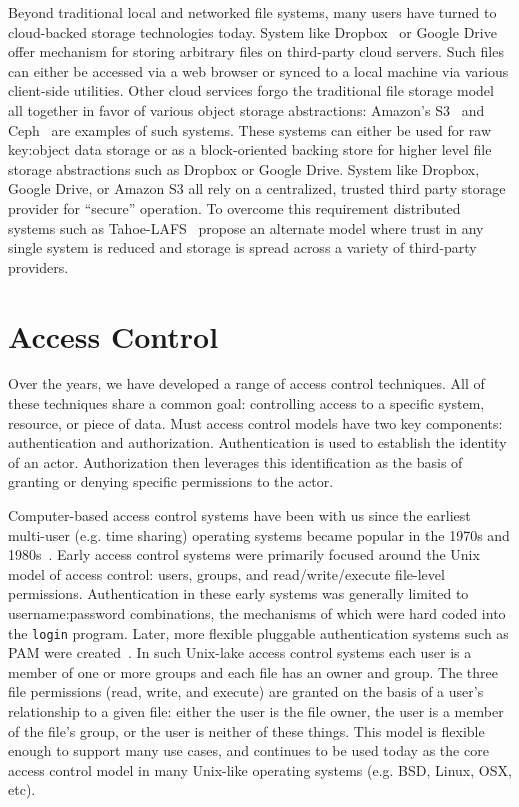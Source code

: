 Beyond traditional local and networked file systems, many users have
turned to cloud-backed storage technologies today. System like
Dropbox~\cite{dropbox} or Google Drive~\cite{google-drive} offer
mechanism for storing arbitrary files on third-party cloud
servers. Such files can either be accessed via a web browser or synced
to a local machine via various client-side utilities. Other cloud
services forgo the traditional file storage model all together in
favor of various object storage abstractions: Amazon's
S3~\cite{amazon-s3} and Ceph~\cite{ceph} are examples of such
systems. These systems can either be used for raw key:object data
storage or as a block-oriented backing store for higher level file
storage abstractions such as Dropbox or Google Drive. System like
Dropbox, Google Drive, or Amazon S3 all rely on a centralized, trusted
third party storage provider for ``secure'' operation. To overcome
this requirement distributed systems such as
Tahoe-LAFS~\cite{wilcox-o'hearn2008} propose an alternate model where
trust in any single system is reduced and storage is spread across a
variety of third-party providers.

\section{Access Control}
\label{chap:background:ac}

Over the years, we have developed a range of access control
techniques. All of these techniques share a common goal: controlling
access to a specific system, resource, or piece of data. Must access
control models have two key components: authentication and
authorization.  Authentication is used to establish the identity of an
actor. Authorization then leverages this identification as the basis
of granting or denying specific permissions to the actor.

Computer-based access control systems have been with us since the
earliest multi-user (e.g. time sharing) operating systems became
popular in the 1970s and 1980s~\cite{saltzer1974}. Early access
control systems were primarily focused around the Unix model of access
control: users, groups, and read/write/execute file-level
permissions. Authentication in these early systems was generally
limited to username:password combinations, the mechanisms of which
were hard coded into the \texttt{login} program. Later, more flexible
pluggable authentication systems such as PAM were
created~\cite{samar1996, linux-pam, openpam}. In such Unix-lake access
control systems each user is a member of one or more groups and each
file has an owner and group. The three file permissions (read, write,
and execute) are granted on the basis of a user's relationship to a
given file: either the user is the file owner, the user is a member of
the file's group, or the user is neither of these things. This model
is flexible enough to support many use cases, and continues to be used
today as the core access control model in many Unix-like operating
systems (e.g. BSD, Linux, OSX, etc).

